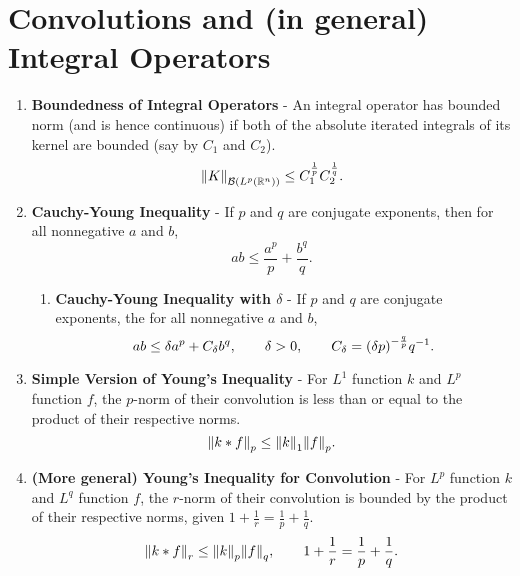 \documentclass{article}
\begin{document}
    \section{Convolutions and (in general) Integral Operators}
    \begin{enumerate}
        \item \textbf{Boundedness of Integral Operators} - An integral operator has bounded norm (and is hence continuous) if both of the absolute iterated integrals of its kernel are bounded (say by $C_1$ and $C_2$). $$\norm{K}_{\mathcal{B}(L^p(\mathbb{R}^n))} \leq C_1^\frac{1}{p}C_2^\frac{1}{q}.$$
        \item \textbf{Cauchy-Young Inequality} - If $p$ and $q$ are conjugate exponents, then for all nonnegative $a$ and $b$, $$ab \leq \frac{a^p}{p} + \frac{b^q}{q}.$$
        \begin{enumerate}
            \item \textbf{Cauchy-Young Inequality with $\delta$} - If $p$ and $q$ are conjugate exponents, the for all nonnegative $a$ and $b$, $$ab \leq \delta a^p + C_\delta b^q, \qquad \delta > 0, \qquad C_\delta = \qty(\delta p)^{-\frac{q}{p}}q^{-1}.$$
        \end{enumerate}
        \item \textbf{Simple Version of Young's Inequality} - For $L^1$ function $k$ and $L^p$ function $f$, the $p$-norm of their convolution is less than or equal to the product of their respective norms.  $$\norm{k * f}_p \leq \norm{k}_1 \norm{f}_p.$$
        \item \textbf{(More general) Young's Inequality for Convolution} - For $L^p$ function $k$ and $L^q$ function $f$, the $r$-norm of their convolution is bounded by the product of their respective norms, given $1 + \frac{1}{r} = \frac{1}{p} + \frac{1}{q}$.  $$\norm{k * f}_r \leq \norm{k}_p\norm{f}_q, \qquad 1 + \frac{1}{r} = \frac{1}{p} + \frac{1}{q}.$$
    \end{enumerate}
\end{document}
